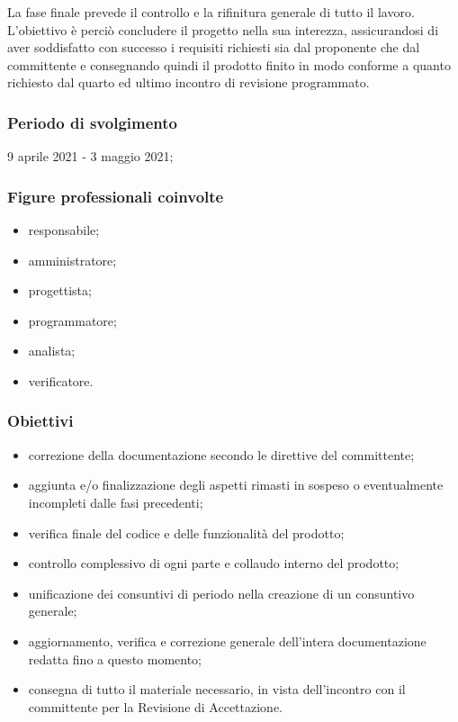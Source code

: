 La fase finale prevede il controllo e la rifinitura generale di tutto il lavoro. L'obiettivo è perciò concludere il progetto nella sua interezza, assicurandosi di aver soddisfatto con successo i requisiti richiesti sia dal proponente che dal committente e consegnando quindi il prodotto finito in modo conforme a quanto richiesto dal quarto ed ultimo incontro di revisione programmato.
        
        \subsubsection{Periodo di svolgimento}
        9 aprile 2021 - 3 maggio 2021;
        
        \subsubsection{Figure professionali coinvolte}
            \begin{itemize}
                \item responsabile;
                \item amministratore;
                \item progettista;
                \item programmatore;
                \item analista;
                \item verificatore.
            \end{itemize}

        \subsubsection{Obiettivi}
        \begin{itemize}
            \item correzione della documentazione secondo le direttive del committente;
            \item aggiunta e/o finalizzazione degli aspetti rimasti in sospeso o eventualmente incompleti dalle fasi precedenti;
            \item verifica finale del codice e delle funzionalità del prodotto;
            \item controllo complessivo di ogni parte e collaudo interno del prodotto;
            \item unificazione dei consuntivi di periodo nella creazione di un consuntivo generale;
            \item aggiornamento, verifica e correzione generale dell'intera documentazione redatta fino a questo momento;
            \item consegna di tutto il materiale necessario, in vista dell'incontro con il committente per la Revisione di Accettazione.
        \end{itemize}